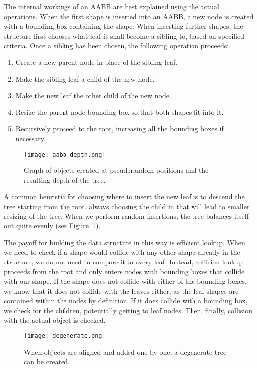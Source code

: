 The internal workings of an AABB are best explained using the actual operations. When the first shape is inserted into an AABB, a new node is created with a bounding box containing the shape. When inserting further shapes, the structure first chooses what leaf it shall become a sibling to, based on specified criteria.
Once a sibling has been chosen, the following operation proceeds:

\begin{enumerate}
\item Create a new parent node in place of the sibling leaf.
\item Make the sibling leaf a child of the new node.
\item Make the new leaf the other child of the new node.
\item Resize the parent node bounding box so that both shapes fit into it.
\item Recursively proceed to the root, increasing all the bounding boxes if necessary.
\end{enumerate}

\begin{figure}
  \centering
  \texttt{[image: aabb\_depth.png]}
  \caption{Graph of objects created at pseudorandom positions and the resulting depth of the tree.}\label{fig:aabb_depth}
\end{figure}

A common heuristic for choosing where to insert the new leaf is to descend the tree starting from the root, always choosing the child in that will lead to smaller resizing of the tree. When we perform random insertions, the tree balances itself out quite evenly (see Figure~\ref{fig:aabb_depth}).

The payoff for building the data structure in this way is efficient lookup. When we need to check if a shape would collide with any other shape already in the structure, we do not need to compare it to every leaf. Instead, collision lookup proceeds from the root and only enters nodes with bounding boxes that collide with our shape. If the shape does not collide with either of the bounding boxes, we know that it does not collide with the leaves either, as the leaf shapes are contained within the nodes by definition. If it does collide with a bounding box, we check for the children, potentially getting to leaf nodes. Then, finally, collision with the actual object is checked.

\begin{wrapfigure}{r}{0.4\textwidth}
  \centering
  \texttt{[image: degenerate.png]}
  \caption{When objects are aligned and added one by one, a degenerate tree can be created.}
\end{wrapfigure}

